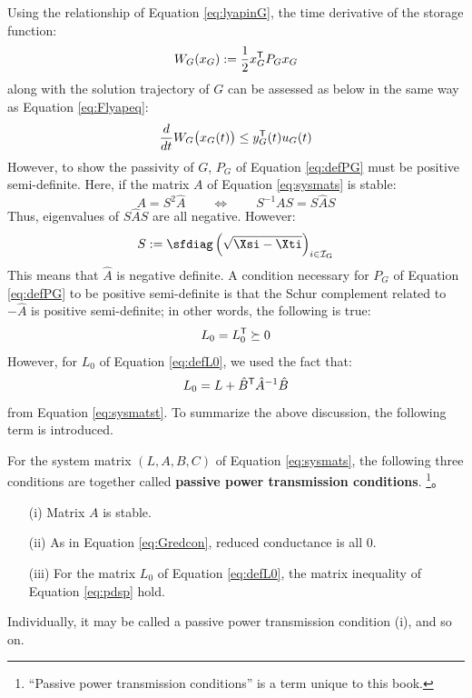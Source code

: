 \documentclass[graybox, envcountchap]{svmult}
\begin{document}
Using the relationship of Equation \ref{eq:lyapinG}, the time derivative of the storage function: 
\begin{align}\label{eq:WGdef}
W_G(x_G):= \frac{1}{2}x_G^{\sf T}P_Gx_G
\end{align}
along with the solution trajectory of $G$ can be assessed as below in the same way as Equation \ref{eq:Flyapeq}: 
\begin{align}\label{eq:Glyapeq}
\frac{d}{dt} W_G \bigl( x_G (t) \bigr)
 \leq 
y_G^{\sf T}(t) u_G(t)
\end{align}
However, to show the passivity of $G$, $P_G$ of Equation \ref{eq:defPG} must be positive semi-definite.
Here, if the matrix $A$ of Equation \ref{eq:sysmats} is stable:
\[
A= S^2 \hat{A}
\qquad \Longleftrightarrow \qquad S^{-1} A S = S \hat{A} S
\]
Thus, eigenvalues of $S \hat{A} S$ are all negative.
However:
\[
S:=\sfdiag \left( \sqrt{ \Xsi -  \Xti }\right)_{i \in \mathcal{I}_{\rm G} } 
\]
This means that $ \hat{A} $ is negative definite.
A condition necessary for $P_G$ of Equation \ref{eq:defPG} to be positive semi-definite is that the Schur complement related to $ -\hat{A} $ is positive semi-definite; in other words, the following is true:
\begin{align}\label{eq:pdsp}
L_0 =L_0^{\sf T} \succeq 0
\end{align}
However, for $L_0$ of Equation \ref{eq:defL0}, we used the fact that:
\[
L_0 = L + \hat{B}^{\sf T} \hat{A}^{-1} \hat{B}
\]
from Equation \ref{eq:sysmatst}.
To summarize the above discussion, the following term is introduced.

\begin{definition}\label{def:passtrans}
For the system matrix $(L,A,B,C)$ of Equation \ref{eq:sysmats}, the following three conditions are together called \textbf{passive power transmission conditions}.
\footnote{
“Passive power transmission conditions” is a term unique to this book.
}。
\begin{itemize}
\item[(i)] Matrix $A$ is stable.
\item[(ii)] As in Equation \ref{eq:Gredcon}, reduced conductance is all 0.
\item[(iii)] For the matrix $L_0$ of Equation \ref{eq:defL0}, the matrix inequality of Equation \ref{eq:pdsp} hold. 
\end{itemize}
Individually, it may be called a passive power transmission condition (i), and so on.
\end{definition}
\end{document}
